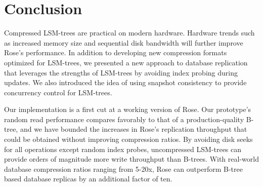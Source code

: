 \documentclass{vldb}
\newcommand{\rows}{Rose\xspace}
\newcommand{\rowss}{Rose's\xspace}
\begin{document}


\section{Conclusion}

Compressed LSM-trees are practical on modern hardware.  Hardware trends such as increased memory size and sequential disk bandwidth will further improve \rowss performance.  In addition
to developing new compression formats optimized for LSM-trees, we presented a new approach to
database replication that leverages the strengths of LSM-trees by
avoiding index probing during updates.  We also introduced the idea of
using snapshot consistency to provide concurrency control for
LSM-trees.


Our implementation is a first cut at a working version of \rows.
Our prototype's random read performance compares favorably to that of a production-quality B-tree, and we have
bounded the increases in \rowss replication throughput that could be obtained without improving compression ratios.
By avoiding disk seeks for all operations except
random index probes, uncompressed LSM-trees can provide orders of magnitude more write throughput than 
B-trees.  With real-world
database compression ratios ranging from 5-20x, \rows
can outperform B-tree based database replicas by an
additional factor of ten.

\end{document}
